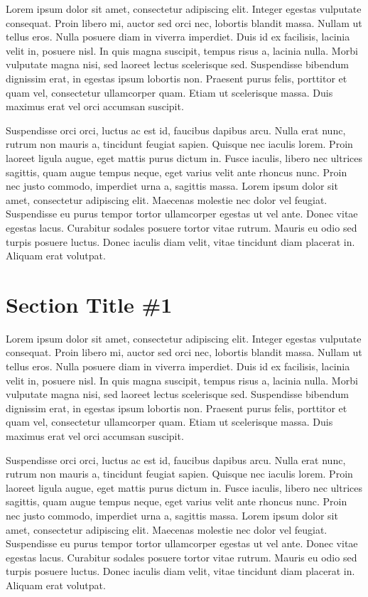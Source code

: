 \documentclass[phd]{und-thesis}
\begin{document}

Lorem ipsum dolor sit amet, consectetur adipiscing elit. Integer egestas vulputate consequat. Proin libero mi, auctor sed orci nec, lobortis blandit massa. Nullam ut tellus eros. Nulla posuere diam in viverra imperdiet. Duis id ex facilisis, lacinia velit in, posuere nisl. In quis magna suscipit, tempus risus a, lacinia nulla. Morbi vulputate magna nisi, sed laoreet lectus scelerisque sed. Suspendisse bibendum dignissim erat, in egestas ipsum lobortis non. Praesent purus felis, porttitor et quam vel, consectetur ullamcorper quam. Etiam ut scelerisque massa. Duis maximus erat vel orci accumsan suscipit.

Suspendisse orci orci, luctus ac est id, faucibus dapibus arcu. Nulla erat nunc, rutrum non mauris a, tincidunt feugiat sapien. Quisque nec iaculis lorem. Proin laoreet ligula augue, eget mattis purus dictum in. Fusce iaculis, libero nec ultrices sagittis, quam augue tempus neque, eget varius velit ante rhoncus nunc. Proin nec justo commodo, imperdiet urna a, sagittis massa. Lorem ipsum dolor sit amet, consectetur adipiscing elit. Maecenas molestie nec dolor vel feugiat. Suspendisse eu purus tempor tortor ullamcorper egestas ut vel ante. Donec vitae egestas lacus. Curabitur sodales posuere tortor vitae rutrum. Mauris eu odio sed turpis posuere luctus. Donec iaculis diam velit, vitae tincidunt diam placerat in. Aliquam erat volutpat.

\section{Section Title \#1}

Lorem ipsum dolor sit amet, consectetur adipiscing elit. Integer egestas vulputate consequat. Proin libero mi, auctor sed orci nec, lobortis blandit massa. Nullam ut tellus eros. Nulla posuere diam in viverra imperdiet. Duis id ex facilisis, lacinia velit in, posuere nisl. In quis magna suscipit, tempus risus a, lacinia nulla. Morbi vulputate magna nisi, sed laoreet lectus scelerisque sed. Suspendisse bibendum dignissim erat, in egestas ipsum lobortis non. Praesent purus felis, porttitor et quam vel, consectetur ullamcorper quam. Etiam ut scelerisque massa. Duis maximus erat vel orci accumsan suscipit.

Suspendisse orci orci, luctus ac est id, faucibus dapibus arcu. Nulla erat nunc, rutrum non mauris a, tincidunt feugiat sapien. Quisque nec iaculis lorem. Proin laoreet ligula augue, eget mattis purus dictum in. Fusce iaculis, libero nec ultrices sagittis, quam augue tempus neque, eget varius velit ante rhoncus nunc. Proin nec justo commodo, imperdiet urna a, sagittis massa. Lorem ipsum dolor sit amet, consectetur adipiscing elit. Maecenas molestie nec dolor vel feugiat. Suspendisse eu purus tempor tortor ullamcorper egestas ut vel ante. Donec vitae egestas lacus. Curabitur sodales posuere tortor vitae rutrum. Mauris eu odio sed turpis posuere luctus. Donec iaculis diam velit, vitae tincidunt diam placerat in. Aliquam erat volutpat.
\end{document}
